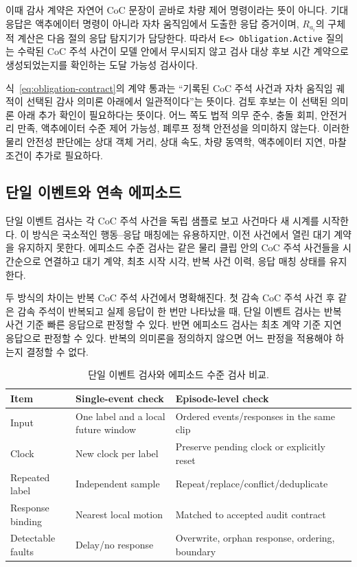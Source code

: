 이때 감사 계약은 자연어 CoC 문장이 곧바로 차량 제어 명령이라는 뜻이 아니다. 기대 응답은 액추에이터 명령이 아니라 자차 움직임에서 도출한 응답 증거이며, $R_{a_i}$의 구체적 계산은 다음 절의 응답 탐지기가 담당한다. 따라서 \texttt{E<> Obligation.Active} 질의는 수락된 CoC 주석 사건이 모델 안에서 무시되지 않고 검사 대상 후보 시간 계약으로 생성되었는지를 확인하는 도달 가능성 검사이다.

식~\eqref{eq:obligation-contract}의 계약 통과는 ``기록된 CoC 주석 사건과 자차 움직임 궤적이 선택된 감사 의미론 아래에서 일관적이다''는 뜻이다. 검토 후보는 이 선택된 의미론 아래 추가 확인이 필요하다는 뜻이다. 어느 쪽도 법적 의무 준수, 충돌 회피, 안전거리 만족, 액추에이터 수준 제어 가능성, 폐루프 정책 안전성을 의미하지 않는다. 이러한 물리 안전성 판단에는 상대 객체 거리, 상대 속도, 차량 동역학, 액추에이터 지연, 마찰 조건이 추가로 필요하다.

\subsection{단일 이벤트와 연속 에피소드}
단일 이벤트 검사는 각 CoC 주석 사건을 독립 샘플로 보고 사건마다 새 시계를 시작한다. 이 방식은 국소적인 행동--응답 매칭에는 유용하지만, 이전 사건에서 열린 대기 계약을 유지하지 못한다. 에피소드 수준 검사는 같은 물리 클립 안의 CoC 주석 사건들을 시간순으로 연결하고 대기 계약, 최초 시작 시각, 반복 사건 이력, 응답 매칭 상태를 유지한다.

두 방식의 차이는 반복 CoC 주석 사건에서 명확해진다. 첫 감속 CoC 주석 사건 후 같은 감속 주석이 반복되고 실제 응답이 한 번만 나타났을 때, 단일 이벤트 검사는 반복 사건 기준 빠른 응답으로 판정할 수 있다. 반면 에피소드 검사는 최초 계약 기준 지연 응답으로 판정할 수 있다. 반복의 의미론을 정의하지 않으면 어느 판정을 적용해야 하는지 결정할 수 없다.

\begin{table}[t]
\centering
\caption{단일 이벤트 검사와 에피소드 수준 검사 비교.}
\label{tab:event-vs-episode}
\footnotesize
\begin{tabularx}{\columnwidth}{L{0.27\columnwidth}YY}
\toprule
Item & Single-event check & Episode-level check \\
\midrule
Input & One label and a local future window & Ordered events/responses in the same clip \\
Clock & New clock per label & Preserve pending clock or explicitly reset \\
Repeated label & Independent sample & Repeat/replace/conflict/deduplicate \\
Response binding & Nearest local motion & Matched to accepted audit contract \\
Detectable faults & Delay/no response & Overwrite, orphan response, ordering, boundary \\
\bottomrule
\end{tabularx}
\end{table}


